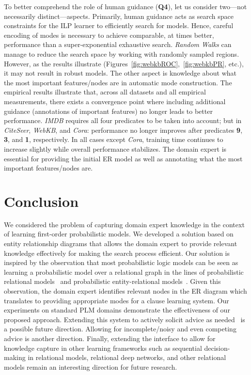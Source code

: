 \documentclass[sigconf]{acmart}
\begin{document}

To better comprehend the role of human guidance (\textbf{Q4}), let us consider two---not necessarily distinct---aspects. Primarily, human guidance acts as search space constraints for the ILP learner to efficiently search for models. Hence, careful encoding of modes is necessary to achieve comparable, at times better, performance than a super-exponential exhaustive search. \textit{Random Walks} can manage to reduce the search space by working with randomly sampled regions. However, as the results illustrate (Figures~\ref{fig:webkbROC},~\ref{fig:webkbPR}, etc.), it may not result in robust models. The other aspect is knowledge about what the most important features/nodes are in automatic mode construction. The empirical results illustrate that, across all datasets and all empirical measurements, there exists a convergence point where including additional guidance (annotations of important features) no longer leads to better performance. \textit{IMDB} requires all four predicates to be taken into account; but in \textit{CiteSeer}, \textit{WebKB}, and \textit{Cora}: performance no longer improves after predicates \textbf{9}, \textbf{3}, and \textbf{1}, respectively. In all cases except \textit{Cora}, training time continues to increase slightly while overall performance stabilizes. The domain expert is essential for providing the initial ER model as well as annotating what the most important features/nodes are.

\section{Conclusion}

We considered the problem of capturing domain expert knowledge in the context of learning first-order probabilistic models. We developed a solution based on entity relationship diagrams that allows the domain expert to provide relevant knowledge effectively for making the search process efficient. Our solution is inspired by the observation that most  probabilistic logic models can be seen as learning a probabilistic model over a relational graph in the lines of probabilistic relational models~\cite{prm}
and probabilistic entity-relational models~\cite{daper}. Given this observation, the domain expert identifies relevant nodes in the ER diagram which translates to providing appropriate modes for a clause learning system. Our experiments on standard PLM domains demonstrate the effectiveness of our proposed approach.
Extending this system to actively solicit advice as needed~\cite{odom2016ECML} is a possible future direction. Allowing for incomplete/noisy and even competing advice is another direction. Finally, extending the interface to allow for knowledge capture in other learning frameworks such as sequential decision-making in relational models, relational deep networks, and other relational models remain an interesting direction for future research.
\end{document}
